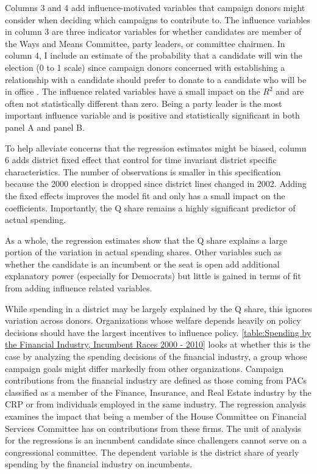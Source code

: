 \documentclass[12pt,final,fleqn]{article}
\theoremstyle{plain}
\begin{document}
Columns 3 and 4 add influence-motivated variables that campaign donors might consider when deciding which campaigns to contribute to. The influence variables in column 3 are three indicator variables for whether candidates are member of the Ways and Means Committee, party leaders, or committee chairmen. In column 4, I include an estimate of the probability that a candidate will win the election (0 to 1 scale) since campaign donors concerned with establishing a relationship with a candidate should prefer to donate to a candidate who will be in office \citep[see for instance][]{snyder1990campaign}. The influence related variables have a small impact on the $R^2$ and are often not statistically different than zero. Being a party leader is the most important influence variable and is positive and statistically significant in both panel A and panel B.

To help alleviate concerns that the regression estimates might be biased, column 6 adds district fixed effect that control for time invariant district specific characteristics. The number of observations is smaller in this specification because the 2000 election is dropped since district lines changed in 2002. Adding the fixed effects improves the model fit and only has a small impact on the coefficients. Importantly, the Q share remains a highly significant predictor of actual spending.

As a whole, the regression estimates show that the Q share explains a large portion of the variation in actual spending shares. Other variables such as whether the candidate is an incumbent or the seat is open add additional explanatory power (especially for Democrats) but little is gained in terms of fit from adding influence related variables.

While spending in a district may be largely explained by the Q share, this ignores variation across donors. Organizations whose welfare depends heavily on policy decisions should have the largest incentives to influence policy. \autoref{table:Spending by the Financial Industry, Incumbent Races 2000 - 2010} looks at whether this is the case by analyzing the spending decisions of the financial industry, a group whose campaign goals might differ markedly from other organizations. Campaign contributions from the financial industry are defined as those coming from PACs classified as a member of the Finance, Insurance, and Real Estate industry by the CRP or from individuals employed in the same industry. The regression analysis examines the impact that being a member of the House Committee on Financial Services Committee has on contributions from these firms. The unit of analysis for the regressions is an incumbent candidate since challengers cannot serve on a congressional committee. The dependent variable is the district share of yearly spending by the financial industry on incumbents. 
\end{document}
